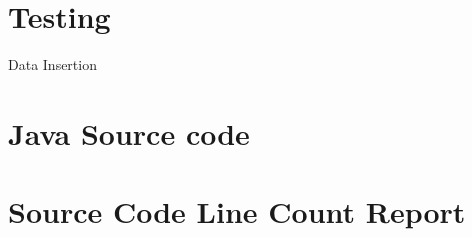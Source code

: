 \documentclass[a4paper,10pt,toc=graduated]{article}
\begin{document}
\begin{appendices}
\section{Testing}
\begin{mySubsection}{Data Insertion}

\end{mySubsection}
\section{Java Source code}

\section{Source Code Line Count Report}

\end{appendices}
\end{document}
